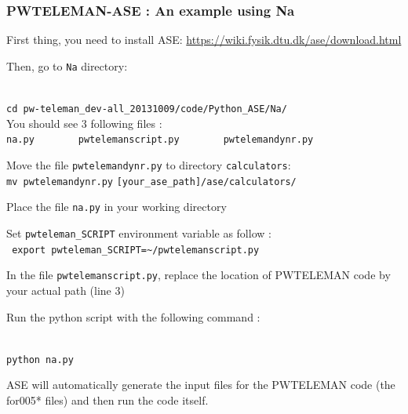 \documentclass[10pt]{beamer}
\begin{document}
\begin{frame}
\frametitle{PWTELEMAN-ASE : An example using Na}
\begin{enumerate}

\item \small{First thing, you need to install ASE: \href{https://wiki.fysik.dtu.dk/ase/download.html}{https://wiki.fysik.dtu.dk/ase/download.html}
     \vspace*{0.2cm}
     
\item Then, go to {\tt Na} directory:}\\
\small{{\tt cd pw-teleman\_dev-all\_20131009/code/Python\_ASE/Na/}}\\
You should see 3 following files : \\
{\tt na.py}~~~~~~~~{\tt pwtelemanscript.py}~~~~~~~~{\tt pwtelemandynr.py}\\
\vspace*{0.2cm}

\item Move the file {\tt pwtelemandynr.py} to directory {\tt calculators}:\\
\footnotesize{{\tt mv pwtelemandynr.py} {\tt [your\_ase\_path]/ase/calculators/}}\\
\vspace*{0.2cm}

\item \small{Place the file {\tt na.py} in your working directory}
\vspace*{0.2cm}

\item Set {\tt pwteleman\_SCRIPT} environment variable as follow :\\ 
\footnotesize{{\tt 
export pwteleman\_SCRIPT=\textasciitilde/pwtelemanscript.py}}
\vspace*{0.2cm}

\item \small{In the file {\tt pwtelemanscript.py}, replace the location of PWTELEMAN code by your actual path (line 3)
\vspace*{0.2cm}

\item Run the python script with the following command : }\\
{\tt python na.py}
\end{enumerate}

\small{ASE will automatically generate the input files for the PWTELEMAN code (the for005* files) and then run the code itself. }

\end{frame}
\end{document}
